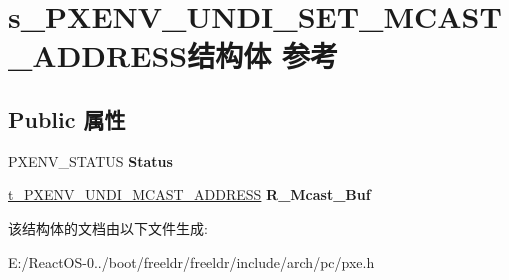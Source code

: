 \hypertarget{structs___p_x_e_n_v___u_n_d_i___s_e_t___m_c_a_s_t___a_d_d_r_e_s_s}{}\section{s\+\_\+\+P\+X\+E\+N\+V\+\_\+\+U\+N\+D\+I\+\_\+\+S\+E\+T\+\_\+\+M\+C\+A\+S\+T\+\_\+\+A\+D\+D\+R\+E\+S\+S结构体 参考}
\label{structs___p_x_e_n_v___u_n_d_i___s_e_t___m_c_a_s_t___a_d_d_r_e_s_s}
\subsection*{Public 属性}
\begin{DoxyCompactItemize}
\item 
\mbox{\label{structs___p_x_e_n_v___u_n_d_i___s_e_t___m_c_a_s_t___a_d_d_r_e_s_s_a1585012d3c3fd926f6494ab1bb36025e}} 
P\+X\+E\+N\+V\+\_\+\+S\+T\+A\+T\+US {\bfseries Status}
\item 
\mbox{\label{structs___p_x_e_n_v___u_n_d_i___s_e_t___m_c_a_s_t___a_d_d_r_e_s_s_a5b7f856945eadfc7f0106ae2201bf15f}} 
\hyperlink{structs___p_x_e_n_v___u_n_d_i___m_c_a_s_t___a_d_d_r_e_s_s}{t\+\_\+\+P\+X\+E\+N\+V\+\_\+\+U\+N\+D\+I\+\_\+\+M\+C\+A\+S\+T\+\_\+\+A\+D\+D\+R\+E\+SS} {\bfseries R\+\_\+\+Mcast\+\_\+\+Buf}
\end{DoxyCompactItemize}


该结构体的文档由以下文件生成\+:\begin{DoxyCompactItemize}
\item 
E\+:/\+React\+O\+S-\/0../boot/freeldr/freeldr/include/arch/pc/pxe.\+h\end{DoxyCompactItemize}
